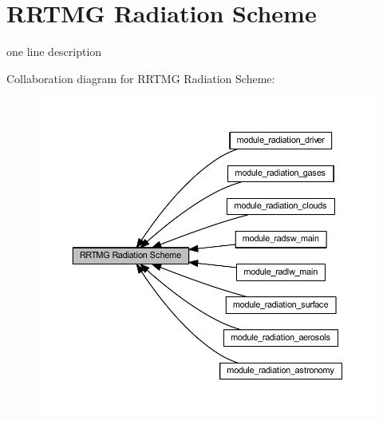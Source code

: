 \hypertarget{group__rad}{}\section{R\+R\+T\+MG Radiation Scheme}
\label{group__rad}


one line description  


Collaboration diagram for R\+R\+T\+MG Radiation Scheme\+:\nopagebreak
\begin{figure}[H]
\begin{center}
\leavevmode
\includegraphics[width=350pt]{group__rad}
\end{center}
\end{figure}
